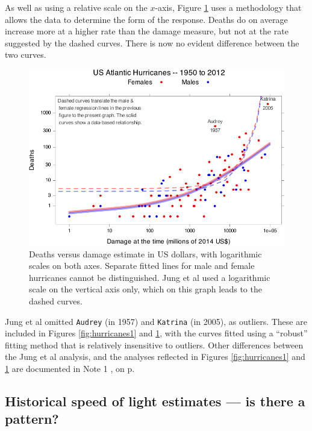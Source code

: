 \documentclass[
  10pt,
  b5paper]{book}
\begin{document}
As well as using a relative scale on the \(x\)-axis, Figure
\ref{fig:hurricanes2} uses a methodology that allows the
data to determine the form of the response. Deaths do on
average increase more at a higher rate than the damage measure,
but not at the rate suggested by the dashed curves. There
is now no evident difference between the two curves.

\begin{figure}[H]

{\centering \includegraphics[width=0.85\linewidth]{08-observational_files/figure-latex/hurricanes2-1} 

}

\caption{Deaths versus damage estimate in US dollars, with logarithmic scales
               on both axes. Separate fitted lines for male and female
               hurricanes cannot be distinguished. Jung et al used a 
               logarithmic scale on the vertical axis only, which on
               this graph leads to the dashed curves.}\label{fig:hurricanes2}
\end{figure}

Jung et al omitted \texttt{Audrey} (in 1957) and \texttt{Katrina} (in 2005), as
outliers. These are included in Figures \ref{fig:hurricanes1} and \ref{fig:hurricanes2}, with the curves fitted using a ``robust''
fitting method that is relatively insensitive to outliers.
Other differences between the Jung et al analysis, and the
analyses reflected in Figures \ref{fig:hurricanes1} and
\ref{fig:hurricanes2} are documented in Note 1
, on p.~\pageref{hurricanes}

\hypertarget{historical-speed-of-light-estimates-is-there-a-pattern}{%
\subsection*{Historical speed of light estimates --- is there a pattern?}\label{historical-speed-of-light-estimates-is-there-a-pattern}}
\end{document}
